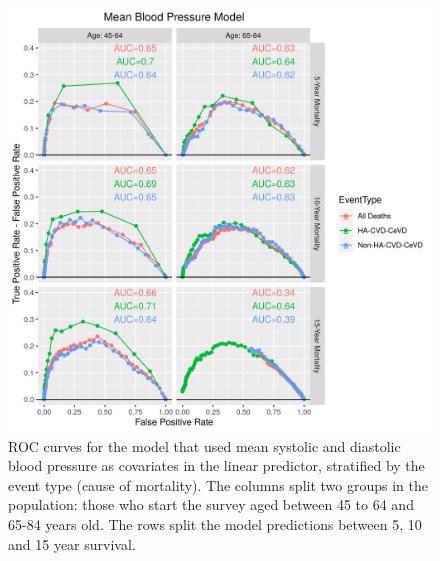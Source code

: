 \documentclass[
]{article}
\begin{document}
\begin{figure}
\centering
\includegraphics{./Rmarkdown_Plots/ROC_MeanBPModel_CAx-EventType.png}
\caption{ROC curves for the model that used mean systolic and diastolic blood pressure as covariates in the linear predictor, stratified by the event type (cause of mortality). The columns split two groups in the population: those who start the survey aged between 45 to 64 and 65-84 years old. The rows split the model predictions between 5, 10 and 15 year survival.}\label{fig:ROC_MeanBP}
\end{figure}
\end{document}
